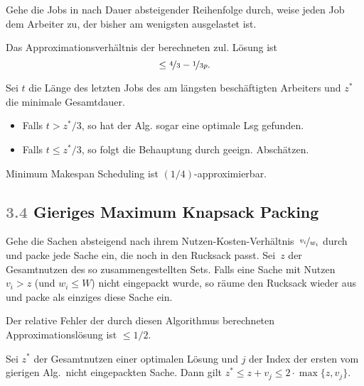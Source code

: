 \documentclass{cheat-sheet}
\newcommand{\Problem}[1]{\textcolor{ProblemColor}{\textbf{#1}}}
\newcommand{\scriptSection}[1]{\textcolor{gray}{#1}\enspace}
\begin{document}
\begin{alg}
  Gehe die Jobs in nach Dauer absteigender Reihenfolge durch, weise jeden Job dem Arbeiter zu, der bisher am wenigsten ausgelastet ist.
\end{alg}

\begin{satz}
  Das Approximationsverhältnis der berechneten zul. Lösung ist
  \[ \leq \nicefrac{4}{3} - \nicefrac{1}{3 p}. \]
\end{satz}

\begin{beweisskizze}
  Sei $t$ die Länge des letzten Jobs des am längsten beschäftigten Arbeiters und $z^*$ die minimale Gesamtdauer.
  \begin{itemize}
    \item Falls $t > z^*/3$, so hat der Alg. sogar eine optimale Lsg gefunden.
    \item Falls $t \leq z^*/3$, so folgt die Behauptung durch geeign. Abschätzen.
  \end{itemize}
\end{beweisskizze}

\begin{kor}
  Minimum Makespan Scheduling ist $(1/4)$-approximierbar.
\end{kor}

\subsection{\scriptSection{3.4} Gieriges \Problem{Maximum Knapsack Packing}}

\begin{alg}
  Gehe die Sachen absteigend nach ihrem Nutzen-Kosten-Verhältnis~$\nicefrac{v_i}{w_i}$ durch und packe jede Sache ein, die noch in den Rucksack passt.
  Sei~$z$ der Gesamtnutzen des so zusammengestellten Sets.
  Falls eine Sache mit Nutzen $v_i > z$ (und $w_i \leq W$) nicht eingepackt wurde, so räume den Rucksack wieder aus und packe als einziges diese Sache ein.
\end{alg}

\begin{satz}
  Der relative Fehler der durch diesen Algorithmus berechneten Approximationslösung ist $\leq 1/2$.
\end{satz}

\begin{beweisskizze}
  Sei $z^*$ der Gesamtnutzen einer optimalen Lösung und $j$ der Index der ersten vom gierigen Alg.\ nicht eingepackten Sache.
  Dann gilt $z^* \leq z + v_j \leq 2 \cdot \max \{ z, v_j \}$.
\end{beweisskizze}
\end{document}
